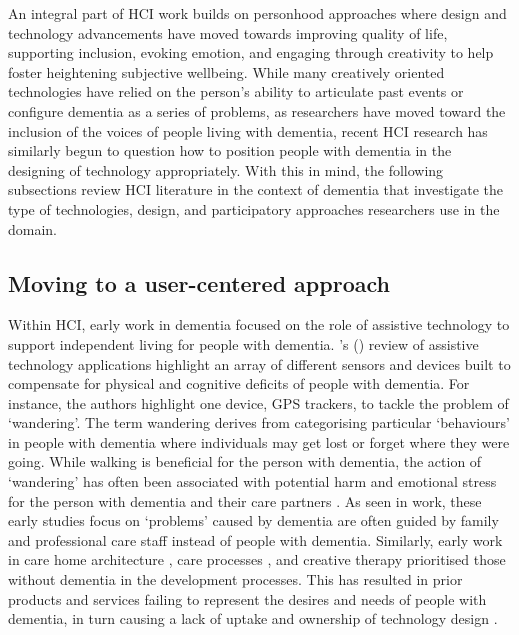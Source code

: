 An integral part of HCI work builds on personhood approaches where design and technology advancements have moved towards improving quality of life, supporting inclusion, evoking emotion, and engaging through creativity to help foster heightening subjective wellbeing. While many creatively oriented technologies have relied on the person's ability to articulate past events or configure dementia as a series of problems, as researchers have moved toward the inclusion of the voices of people living with dementia, recent HCI research has similarly begun to question how to position people with dementia in the designing of technology appropriately. With this in mind, the following subsections review HCI literature in the context of dementia that investigate the type of technologies, design, and participatory approaches researchers use in the domain.

\subsection{Moving to a user-centered approach}
\label{BL:Tech}
Within HCI, early work in dementia focused on the role of assistive technology to support independent living for people with dementia. \citeauthor{bharucha2009intelligent}'s (\citeyear{bharucha2009intelligent}) review of assistive technology applications highlight an array of different sensors and devices built to compensate for physical and cognitive deficits of people with dementia. For instance, the authors highlight one device, GPS trackers, to tackle the problem of `wandering'. The term wandering derives from categorising particular `behaviours' in people with dementia where individuals may get lost or forget where they were going. While walking is beneficial for the person with dementia, the action of `wandering' has often been associated with potential harm and emotional stress for the person with dementia and their care partners \citep{robinson2007balancing}. As seen in \cite{bharucha2009intelligent} work, these early studies focus on `problems' caused by dementia are often guided by family and professional care staff instead of people with dementia. Similarly, early work in care home architecture \citep{torrington2006has}, care processes \citep{rabins2006practical}, and creative therapy \citep{schmitt2006creative} prioritised those without dementia in the development processes. This has resulted in prior products and services failing to represent the desires and needs of people with dementia, in turn causing a lack of uptake and ownership of technology design \citep{gibson2019personalisation}. 

